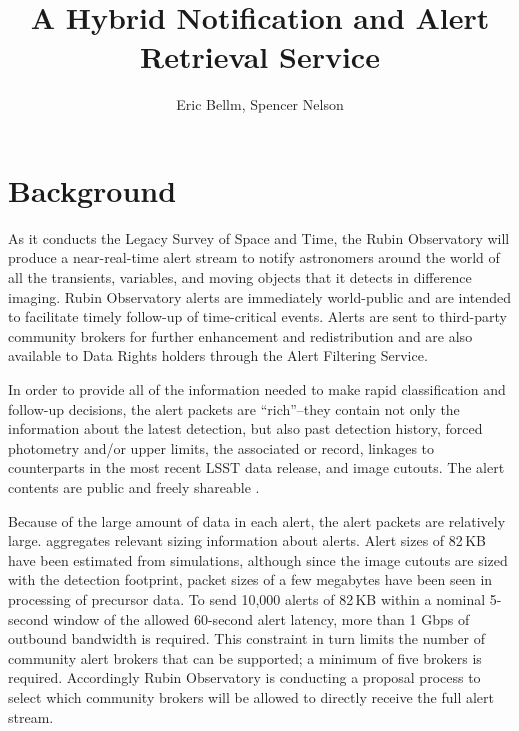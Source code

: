 \documentclass[DM,authoryear,toc]{lsstdoc}
\title{A Hybrid Notification and Alert Retrieval Service}
\author{%
Eric Bellm,
Spencer Nelson
}
\date{\vcsDate}
\begin{document}
\maketitle


\section{Background}

As it conducts the Legacy Survey of Space and Time, the Rubin Observatory will produce a near-real-time alert stream to notify astronomers around the world of all the transients, variables, and moving objects that it detects in difference imaging.
Rubin Observatory alerts are immediately world-public and are intended to facilitate timely follow-up of time-critical events.
Alerts are sent to third-party community brokers for further enhancement and redistribution and are also available to Data Rights holders through the Alert Filtering Service.

In order to provide all of the information needed to make rapid classification and follow-up decisions, the alert packets are ``rich''--they contain not only the information about the latest detection, but also past detection history, forced photometry and/or upper limits, the associated \DIAObject or \SSObject record, linkages to counterparts in the most recent LSST data release, and image cutouts.
The alert contents are public and freely shareable .

Because of the large amount of data in each alert, the alert packets are relatively large.
 aggregates relevant sizing information about alerts.
Alert sizes of 82\,KB have been estimated from simulations, although since the image cutouts are sized with the detection footprint, packet sizes of a few megabytes have been seen in processing of precursor data.
To send 10,000 alerts of 82\,KB within a nominal 5-second window of the allowed 60-second alert latency, more than 1 Gbps of outbound bandwidth is required.
This constraint in turn limits the number of community alert brokers that can be supported; a minimum of five brokers is required.
Accordingly Rubin Observatory is conducting a proposal process to select which community brokers will be allowed to directly receive the full alert stream.
\end{document}
